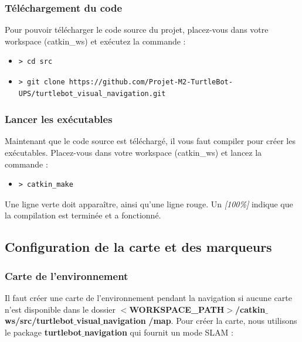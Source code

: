 \documentclass[10pt,a4paper]{article}
\begin{document}
\subsubsection{Téléchargement du code}

Pour pouvoir télécharger le code source du projet, placez-vous dans votre workspace (catkin\_ws) et exécutez la commande :

\begin{itemize}
\item[]  \begin{verbatim}> cd src \end{verbatim}
\item[]  \begin{verbatim}> git clone https://github.com/Projet-M2-TurtleBot-UPS/turtlebot_visual_navigation.git \end{verbatim}
\end{itemize}

\subsubsection{Lancer les exécutables}

Maintenant que le code source est téléchargé, il vous faut compiler pour créer les exécutables. Placez-vous dans votre workspace (catkin\_ws) et lancez la commande :

\begin{itemize}
\item[]  \begin{verbatim}> catkin_make \end{verbatim}
\end{itemize}

Une ligne verte doit apparaître, ainsi qu'une ligne rouge.
Un \upshape \emph{[100\%]} indique que la compilation est terminée et a fonctionné. 

\subsection{Configuration de la carte et des marqueurs}
\label{sec:mapAndMarkersConfig}

\subsubsection{Carte de l'environnement}

Il faut créer une carte de l'environnement pendant la navigation si aucune carte n'est disponible dans le dossier \textbf{$<$WORKSPACE\_PATH$>$/catkin$\_$ws/src/turtlebot$\_$visual$\_$navigation} \textbf{/map}. Pour créer la carte, nous utilisons le package \textbf{turtlebot$\_$navigation} qui fournit un mode SLAM :
\end{document}
